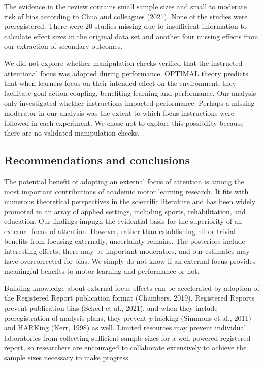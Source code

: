 \documentclass[
  man, donotrepeattitle,floatsintext]{apa7}
\begin{document}
The evidence in the review contains small sample sizes and small to moderate risk of bias according to Chua and colleagues (2021). None of the studies were preregistered. There were 20 studies missing due to insufficient information to calculate effect sizes in the original data set and another four missing effects from our extraction of secondary outcomes.

We did not explore whether manipulation checks verified that the instructed attentional focus was adopted during performance. OPTIMAL theory predicts that when learners focus on their intended effect on the environment, they facilitate goal-action coupling, benefiting learning and performance. Our analysis only investigated whether instructions impacted performance. Perhaps a missing moderator in our analysis was the extent to which focus instructions were followed in each experiment. We chose not to explore this possibility because there are no validated manipulation checks.

\hypertarget{recommendations-and-conclusions}{%
\subsection{Recommendations and conclusions}\label{recommendations-and-conclusions}}

The potential benefit of adopting an external focus of attention is among the most important contributions of academic motor learning research. It fits with numerous theoretical perspectives in the scientific literature and has been widely promoted in an array of applied settings, including sports, rehabilitation, and education. Our findings impugn the evidential basis for the superiority of an external focus of attention. However, rather than establishing nil or trivial benefits from focusing externally, uncertainty remains. The posteriors include interesting effects, there may be important moderators, and our estimates may have overcorrected for bias. We simply do not know if an external focus provides meaningful benefits to motor learning and performance or not.

Building knowledge about external focus effects can be accelerated by adoption of the Registered Report publication format (Chambers, 2019). Registered Reports prevent publication bias (Scheel et al., 2021), and when they include preregistration of analysis plans, they prevent \emph{p}-hacking (Simmons et al., 2011) and HARKing (Kerr, 1998) as well. Limited resources may prevent individual laboratories from collecting sufficient sample sizes for a well-powered registered report, so researchers are encouraged to collaborate extensively to achieve the sample sizes necessary to make progress.
\end{document}
